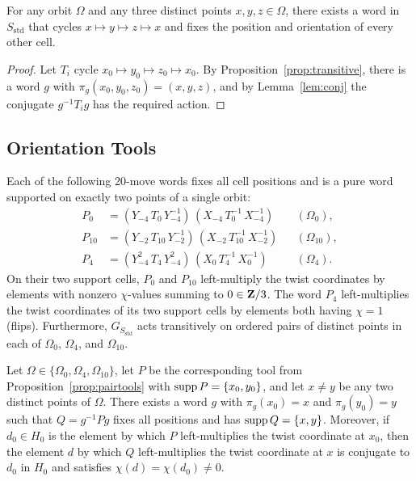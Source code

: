 \documentclass[a4paper,11pt]{article}
\begin{document}
\begin{corollary}\label{cor:any3cycle}
For any orbit $\Omega$ and any three distinct points $x,y,z\in\Omega$, there exists a word in $S_{\mathrm{std}}$ that cycles $x\mapsto y\mapsto z\mapsto x$ and fixes the position and orientation of every other cell.
\end{corollary}

\begin{proof}
Let $T_i$ cycle $x_0\mapsto y_0\mapsto z_0\mapsto x_0$. By Proposition~\ref{prop:transitive}, there is a word $g$ with $\pi_g(x_0,y_0,z_0)=(x,y,z)$, and by Lemma~\ref{lem:conj} the conjugate $g^{-1}T_ig$ has the required action.
\end{proof}

\subsection{Orientation Tools}

\begin{proposition}[Checks C6, C7]\label{prop:pairtools}
Each of the following 20-move words fixes all cell positions and is a pure word supported on exactly two points of a single orbit:
\begin{align*}
P_0&=(Y_{-4}\,T_0\,Y_{-4}^{-1})\,(X_{-4}\,T_0^{-1}\,X_{-4}^{-1})&&(\Omega_0),\\
P_{10}&=(Y_{-2}\,T_{10}\,Y_{-2}^{-1})\,(X_{-2}\,T_{10}^{-1}\,X_{-2}^{-1})&&(\Omega_{10}),\\
P_4&=(Y_{-4}^{2}\,T_4\,Y_{-4}^{2})\,(X_{0}\,T_4^{-1}\,X_{0}^{-1})&&(\Omega_4).
\end{align*}
On their two support cells, $P_0$ and $P_{10}$ left-multiply the twist coordinates by elements with nonzero $\chi$-values summing to $0\in\mathbf{Z}/3$.
The word $P_4$ left-multiplies the twist coordinates of its two support cells by elements both having $\chi=1$ (flips).
Furthermore, $G_{S_{\mathrm{std}}}$ acts transitively on ordered pairs of distinct points in each of $\Omega_0$, $\Omega_4$, and $\Omega_{10}$.
\end{proposition}

\begin{lemma}\label{lem:pairconj}
Let $\Omega\in\{\Omega_0,\Omega_4,\Omega_{10}\}$, let $P$ be the corresponding tool from Proposition~\ref{prop:pairtools} with $\operatorname{supp} P=\{x_0,y_0\}$, and let $x\ne y$ be any two distinct points of $\Omega$.
There exists a word $g$ with $\pi_g(x_0)=x$ and $\pi_g(y_0)=y$ such that $Q=g^{-1}Pg$ fixes all positions and has $\operatorname{supp} Q=\{x,y\}$.
Moreover, if $d_0\in H_0$ is the element by which $P$ left-multiplies the twist coordinate at $x_0$, then the element $d$ by which $Q$ left-multiplies the twist coordinate at $x$ is conjugate to $d_0$ in $H_0$ and satisfies $\chi(d)=\chi(d_0)\ne0$.
\end{lemma}
\end{document}
